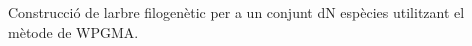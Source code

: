 Construcció de l\textquotesingle{}arbre filogenètic per a un conjunt d\textquotesingle{}N espècies utilitzant el mètode de W\+P\+G\+MA. 